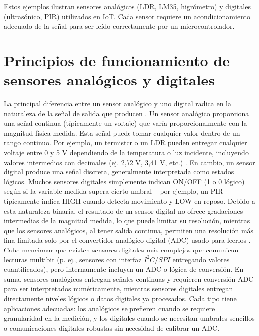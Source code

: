 Estos ejemplos ilustran sensores analógicos (LDR, LM35, higrómetro) y digitales (ultrasónico, PIR) utilizados en IoT. Cada sensor requiere un acondicionamiento adecuado de la señal para ser leído correctamente por un microcontrolador.

\section{Principios de funcionamiento de sensores analógicos y digitales}
La principal diferencia entre un sensor analógico y uno digital radica en la naturaleza de la señal de salida que producen \cite{Ruben2024Sensores}. Un sensor analógico proporciona una señal continua (típicamente un voltaje) que varía proporcionalmente con la magnitud física medida. Esta señal puede tomar cualquier valor dentro de un rango continuo. Por ejemplo, un termistor o un LDR pueden entregar cualquier voltaje entre 0 y 5 V dependiendo de la temperatura o luz incidente, incluyendo valores intermedios con decimales (ej. 2,72 V, 3,41 V, etc.) \cite{Sensores-1}. En cambio, un sensor digital produce una señal discreta, generalmente interpretada como estados lógicos. Muchos sensores digitales simplemente indican ON/OFF (1 o 0 lógico) según si la variable medida supera cierto umbral – por ejemplo, un PIR típicamente indica HIGH cuando detecta movimiento y LOW en reposo. Debido a esta naturaleza binaria, el resultado de un sensor digital no ofrece gradaciones intermedias de la magnitud medida, lo que puede limitar su resolución, mientras que los sensores analógicos, al tener salida continua, permiten una resolución más fina limitada solo por el convertidor analógico-digital (ADC) usado para leerlos \cite{Ruben2024Sensores}. Cabe mencionar que existen sensores digitales más complejos que comunican lecturas multibit (p. ej., sensores con interfaz $I^2C/SPI$ entregando valores cuantificados), pero internamente incluyen un ADC o lógica de conversión. En suma, sensores analógicos entregan señales continuas y requieren conversión ADC para ser interpretados numéricamente, mientras sensores digitales entregan directamente niveles lógicos o datos digitales ya procesados. Cada tipo tiene aplicaciones adecuadas: los analógicos se prefieren cuando se requiere granularidad en la medición, y los digitales cuando se necesitan umbrales sencillos o comunicaciones digitales robustas sin necesidad de calibrar un ADC.

